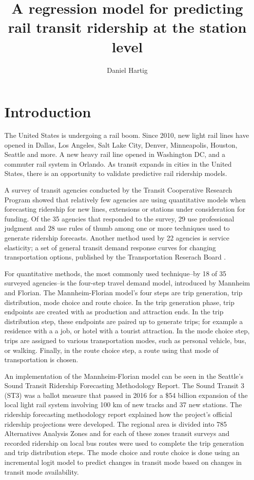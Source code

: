 \documentclass{article}
\title{A regression model for predicting rail transit ridership at the station level}
\author{Daniel Hartig}
\date{\vspace{-5ex}}
\begin{document}
\maketitle

\section{Introduction}

The United States is undergoing a rail boom. Since 2010, new light rail lines have opened in Dallas, Los Angeles, Salt Lake City, Denver, Minneapolis, Houston, Seattle and more.  A new heavy rail line opened in Washington DC, and a commuter rail system in Orlando. As transit expands in cities in the United States, there is an opportunity to validate predictive rail ridership models. 

A survey of transit agencies\cite{Boyle2006} conducted by the Transit Cooperative Research Program showed that relatively few agencies are using quantitative models when forecasting ridership for new lines, extensions or stations under consideration for funding. Of the 35 agencies that responded to the survey, 29 use professional judgment and 28 use rules of thumb among one or more techniques used to generate ridership forecasts. Another method used by 22 agencies is service elasticity; a set of general transit demand response curves for changing transportation options, published by the Transportation Reserach Board \cite{tcrp95}. 

For quantitative methods, the most commonly used technique--by 18 of 35 surveyed agencies--is the four-step travel demand model\cite{McNally2008}, introduced by Mannheim and Florian\cite{Mannheim1979, Florian1988}. The Mannheim-Florian model's four steps are trip generation, trip distribution, mode choice and route choice. In the trip generation phase, trip endpoints are created with as production and attraction ends. In the trip distribution step, these endpoints are paired up to generate trips; for example a residence with a a job, or hotel with a tourist attraction. In the mode choice step, trips are assigned to various transportation modes, such as personal vehicle, bus, or walking. Finally, in the route choice step, a route using that mode of transportation is chosen.

An implementation of the Mannheim-Florian model can be seen in the Seattle's Sound Transit Ridership Forecasting Methodology Report\cite{ST3_2015, ST3_add}. The Sound Transit 3 (ST3) was a ballot measure that passed in 2016 for a \$54 billion expansion of the local light rail system involving 100 km of new tracks and 37 new stations. The ridership forecasting methodology report explained how the project's official ridership projections were developed. The regional area is divided into 785 Alternatives Analysis Zones and for each of these zones transit surveys and recorded ridership on local bus routes were used to complete the trip generation and trip distribution steps. The mode choice and route choice is done using an incremental logit model to predict changes in transit mode based on changes in transit mode availability.
\end{document}

